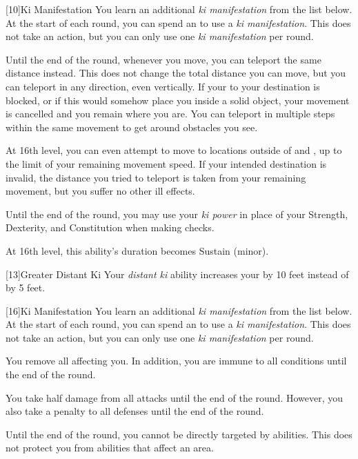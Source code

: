         [10]{Ki Manifestation}
        You learn an additional \textit{ki manifestation} from the list below.
        At the start of each round, you can spend an  to use a \textit{ki manifestation}.
        This does not take an action, but you can only use one \textit{ki manifestation} per round.
        {

            Until the end of the round, whenever you move, you can teleport the same distance instead.
            This does not change the total distance you can move, but you can teleport in any direction, even vertically.
            If your  to your destination is blocked, or if this would somehow place you inside a solid object, your movement is cancelled and you remain where you are.
            You can teleport in multiple steps within the same movement to get around obstacles you see.

            At 16th level, you can even attempt to move to locations outside of  and , up to the limit of your remaining movement speed.
            If your intended destination is invalid, the distance you tried to teleport is taken from your remaining movement, but you suffer no other ill effects.

            Until the end of the round, you may use your \textit{ki power} in place of your Strength, Dexterity, and Constitution when making checks.

            At 16th level, this ability's duration becomes Sustain (minor).
        }

        [13]{Greater Distant Ki} Your \textit{distant ki} ability increases your  by 10 feet instead of by 5 feet.

        [16]{Ki Manifestation}
        You learn an additional \textit{ki manifestation} from the list below.
        At the start of each round, you can spend an  to use a \textit{ki manifestation}.
        This does not take an action, but you can only use one \textit{ki manifestation} per round.
        {
             You remove all  affecting you.
            In addition, you are immune to all conditions until the end of the round.

             You take half damage from all attacks until the end of the round.
            However, you also take a  penalty to all defenses until the end of the round.

             Until the end of the round, you cannot be directly targeted by  abilities.
            This does not protect you from abilities that affect an area.
        }

